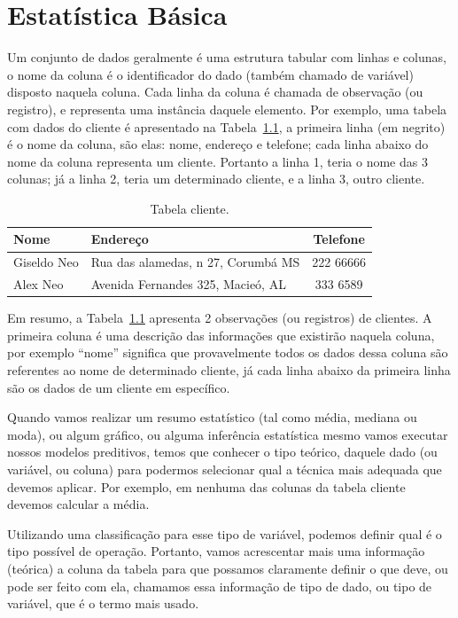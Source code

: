 \documentclass[a4paper,12pt]{book}
\begin{document}
\chapter{Estatística Básica}
	
Um conjunto de dados geralmente é uma estrutura tabular com linhas e colunas, o nome da coluna é o identificador do dado (também chamado de variável) disposto naquela coluna. Cada linha da coluna é chamada de observação (ou registro), e representa uma instância daquele elemento. Por exemplo, uma tabela com dados do cliente é apresentado na Tabela~\ref{tbl:cliente}, a primeira linha (em negrito) é o nome da coluna, são elas: nome, endereço e telefone; cada linha abaixo do nome da coluna representa um cliente. Portanto a linha 1, teria o nome das 3 colunas; já a linha 2, teria um determinado cliente, e a linha 3, outro cliente.

\begin{table}[!h]
	\centering
	\caption{Tabela cliente.}
	\begin{tabular}{|l|l|c|}
	\hline	
	\textbf{Nome} & \textbf{Endereço} & \textbf{Telefone} \\
	\hline	
	Giseldo Neo & Rua das alamedas, n 27, Corumbá MS & 222 66666 \\
	\hline	
	Alex Neo & Avenida Fernandes 325, Macieó, AL& 333 6589 \\
	\hline
	\end{tabular}
	\label{tbl:cliente}	
\end{table}		

Em resumo, a Tabela~\ref{tbl:cliente} apresenta 2 observações (ou registros) de clientes. A primeira coluna é uma descrição das informações que existirão naquela coluna, por exemplo ``nome'' significa que provavelmente todos os dados dessa coluna são referentes ao nome de determinado cliente, já cada linha abaixo da primeira linha são os dados de um cliente em específico. 

Quando vamos realizar um resumo estatístico (tal como média, mediana ou moda), ou algum gráfico, ou alguma inferência estatística mesmo vamos executar nossos modelos preditivos, temos que conhecer o tipo teórico, daquele dado (ou variável, ou coluna) para podermos selecionar qual a técnica mais adequada que devemos aplicar. Por exemplo, em nenhuma das colunas da tabela cliente devemos calcular a média. 

Utilizando uma classificação para esse tipo de variável, podemos definir qual é o tipo possível de operação. Portanto, vamos acrescentar mais uma informação (teórica) a coluna da tabela para que possamos claramente definir o que deve, ou pode ser feito com ela, chamamos essa informação de tipo de dado, ou tipo de variável, que é o termo mais usado. 
\end{document}
